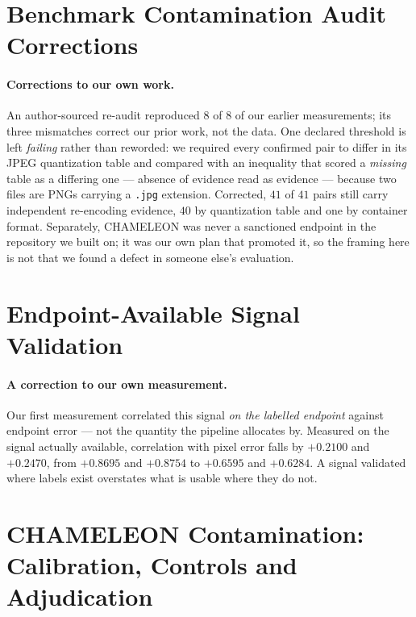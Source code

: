 \documentclass{article} %
\begin{document}
\section{Benchmark Contamination Audit Corrections}

\paragraph{Corrections to our own work.} An author-sourced re-audit reproduced $8$ of $8$ of our
earlier measurements; its three mismatches correct our prior work, not the data. One declared
threshold is left \emph{failing} rather than reworded: we required every confirmed pair to differ in
its JPEG quantization table and compared with an inequality that scored a \emph{missing} table as a
differing one --- absence of evidence read as evidence --- because two files are PNGs carrying a
\texttt{.jpg} extension. Corrected, $41$ of $41$ pairs still carry independent re-encoding evidence,
$40$ by quantization table and one by container format. Separately, CHAMELEON was never a sanctioned
endpoint in the repository we built on; it was our own plan that promoted it, so the framing here is
not that we found a defect in someone else's evaluation.


\section{Endpoint-Available Signal Validation}

\paragraph{A correction to our own measurement.} Our first measurement correlated this signal \emph{on
the labelled endpoint} against endpoint error --- not the quantity the pipeline allocates by. Measured
on the signal actually available, correlation with pixel error falls by $+0.2100$ and $+0.2470$, from
$+0.8695$ and $+0.8754$ to $+0.6595$ and $+0.6284$. A signal validated where labels exist overstates
what is usable where they do not.


\section{CHAMELEON Contamination: Calibration, Controls and Adjudication}
\label{app:chamext}
\end{document}
